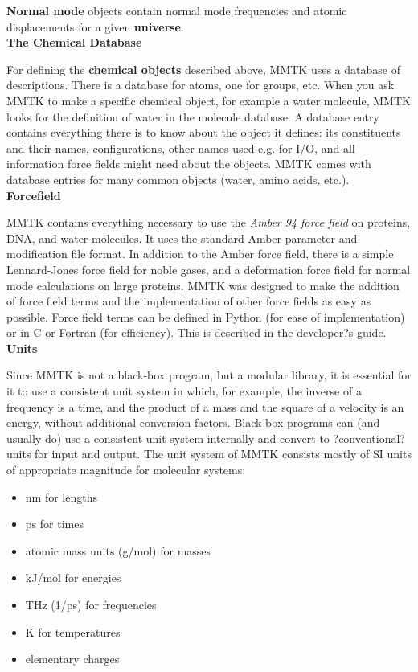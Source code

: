 \documentclass{article}
\begin{document}
\textbf{Normal mode} objects contain normal mode frequencies and atomic displacements for a given \textbf{universe}. \\


\textbf{The Chemical Database}

For defining the \textbf{chemical objects} described above, MMTK uses a database of descriptions.  There is a database for atoms, one for groups, etc.  When you ask MMTK to make a specific chemical object, for example a water molecule, MMTK looks for the definition of water in the molecule database. A database entry contains everything there is to know about the object it defines:  its constituents and their names, configurations, other names used e.g.  for I/O, and all information force fields might need about the objects. MMTK comes with database entries for many common objects (water, amino acids, etc.). \\

\textbf{Forcefield}

MMTK contains everything necessary to use the \textit{Amber 94 force field} on proteins, DNA, and water molecules.  It uses the standard Amber parameter and modification file format.  In addition to the Amber force field, there is a simple Lennard-Jones force field for noble gases, and a deformation force field for normal mode calculations on large proteins. MMTK was designed to make the addition of force field terms and the implementation of other force fields as easy as possible.  Force field terms can be defined in Python (for ease of implementation) or in C or Fortran (for efficiency). This is described in the developer?s guide. \\

\textbf{Units}

Since MMTK is not a black-box program, but a modular library, it is
essential for it to use a consistent unit system in which, for example, the inverse of a frequency is a time, and the product of a mass and the square of a velocity is an energy, without additional conversion factors.  Black-box programs can (and usually do) use a consistent unit system internally and convert to ?conventional? units for input and output. The unit system of MMTK consists mostly of SI units of appropriate magnitude for molecular systems:

\begin{itemize}
  \item nm for lengths
  \item ps for times
  \item atomic mass units (g/mol) for masses
  \item kJ/mol for energies
  \item THz (1/ps) for frequencies
  \item K for temperatures
  \item elementary charges
\end{itemize}
\end{document}
